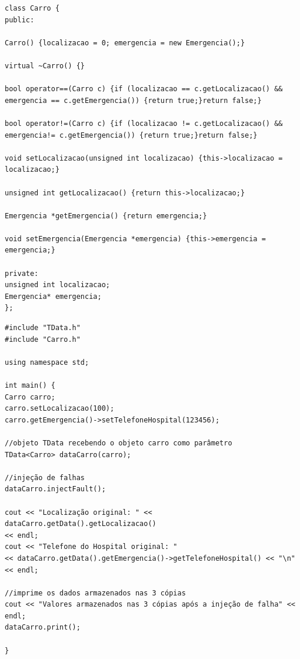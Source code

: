 \begin{lstlisting}[label=Func:CarroPonteiro,caption={[Classe Carro com ponteiro.]Classe de exemplo que contém os dados de localização e as informações dos contatos de emergência. Esta classe foi modificada com a intenção de testar sua eficiência com diferentes tipos de objetos, o atributo emergencia foi alterado para um ponteiro.}]
class Carro {
public:

Carro() {localizacao = 0; emergencia = new Emergencia();}

virtual ~Carro() {}

bool operator==(Carro c) {if (localizacao == c.getLocalizacao() && emergencia == c.getEmergencia()) {return true;}return false;}

bool operator!=(Carro c) {if (localizacao != c.getLocalizacao() && emergencia!= c.getEmergencia()) {return true;}return false;}

void setLocalizacao(unsigned int localizacao) {this->localizacao = localizacao;}

unsigned int getLocalizacao() {return this->localizacao;}

Emergencia *getEmergencia() {return emergencia;}

void setEmergencia(Emergencia *emergencia) {this->emergencia = emergencia;}

private:
unsigned int localizacao;
Emergencia* emergencia;
};

\end{lstlisting}

\begin{lstlisting}[label=Func:CarroPonteiroSaida,caption={[Método que implementada a utilização de um objeto TData do tipo Carro com um ponteiro para um enredeco de memória em seu escopo.]Método que implementada a utilização de um objeto TData do tipo Carro com um ponteiro para um enredeço de memória em seu escopo  e injeta falhas para verificar a integridade dos dados de localização do veículo.}]
#include "TData.h"
#include "Carro.h"

using namespace std;

int main() {
Carro carro;
carro.setLocalizacao(100);
carro.getEmergencia()->setTelefoneHospital(123456);

//objeto TData recebendo o objeto carro como parâmetro
TData<Carro> dataCarro(carro);

//injeção de falhas
dataCarro.injectFault();

cout << "Localização original: " << dataCarro.getData().getLocalizacao()
<< endl;
cout << "Telefone do Hospital original: "
<< dataCarro.getData().getEmergencia()->getTelefoneHospital() << "\n"
<< endl;

//imprime os dados armazenados nas 3 cópias
cout << "Valores armazenados nas 3 cópias após a injeção de falha" << endl;
dataCarro.print();

}
\end{lstlisting}



